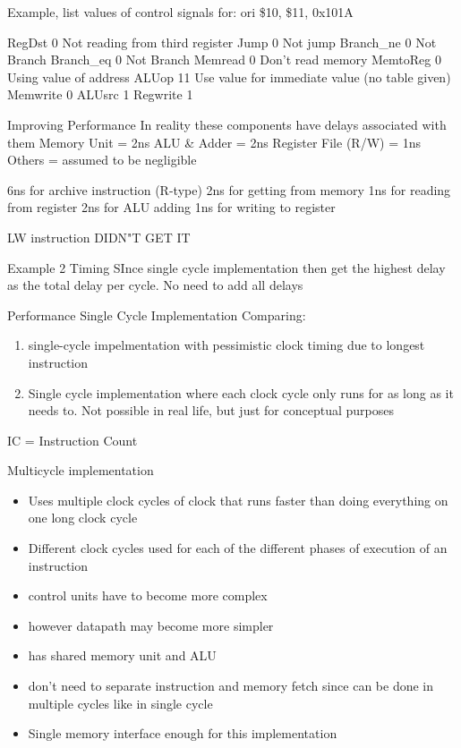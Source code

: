 \documentclass{article}
\begin{document}
		Example, list values of control signals for:   
			ori \$10, \$11, 0x101A

			RegDst		0	Not reading from third register
			Jump		0	Not jump
			Branch\_ne	0	Not Branch
			Branch\_eq	0	Not Branch
			Memread		0	Don't read memory
			MemtoReg	0	Using value of address
			ALUop		11	Use value for immediate value (no table given)
			Memwrite	0
			ALUsrc		1
			Regwrite	1

	Improving Performance
		In reality these components have delays associated with them
		Memory Unit = 2ns
		ALU \& Adder = 2ns
		Register File (R/W) = 1ns
		Others = assumed to be negligible

		6ns for archive instruction (R-type)
			2ns for getting from memory
			1ns for reading from register
			2ns for ALU adding
			1ns for writing to register

		LW instruction
			DIDN"T GET IT

		Example 2
			Timing
				SInce single cycle implementation then get the highest delay as the total delay per cycle. No need to add all delays

		Performance Single Cycle Implementation
			Comparing:
			\begin{enumerate}
				\item single-cycle impelmentation with pessimistic clock timing due to longest instruction
				\item Single cycle implementation where each clock cycle only runs for as long as it needs to. Not possible in real life, but just for conceptual purposes
			\end{enumerate}

			IC = Instruction Count

		Multicycle implementation
		\begin{itemize}
			\item Uses multiple clock cycles of clock that runs faster than doing everything on one long clock cycle
			\item Different clock cycles used for each of the different phases of execution of an instruction
			\item control units have to become more complex
			\item however datapath may become more simpler
		\end{itemize}

		\begin{itemize}
			\item has shared memory unit and ALU
			\item don't need to separate instruction and memory fetch since can be done in multiple cycles like in single cycle
			\item Single memory interface enough for this implementation
		\end{itemize}
\end{document}
